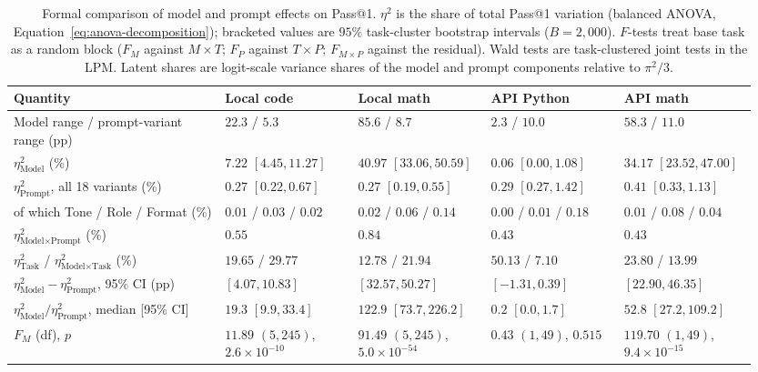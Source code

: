 \documentclass[a4paper,fleqn]{cas-sc}
\begin{document}
\begin{table}[htbp]
\centering
\caption{Formal comparison of model and prompt effects on Pass@1. $\eta^2$ is the share of total Pass@1 variation (balanced ANOVA, Equation~\ref{eq:anova-decomposition}); bracketed values are $95\%$ task-cluster bootstrap intervals ($B = 2{,}000$). $F$-tests treat base task as a random block ($F_M$ against $M \times T$; $F_P$ against $T \times P$; $F_{M \times P}$ against the residual). Wald tests are task-clustered joint tests in the LPM. Latent shares are logit-scale variance shares of the model and prompt components relative to $\pi^2/3$.}\label{tab:model-vs-prompt-decomposition}
\footnotesize
\setlength{\tabcolsep}{3pt}
\begin{tabular}{@{}p{0.27\linewidth}p{0.17\linewidth}p{0.17\linewidth}p{0.17\linewidth}p{0.17\linewidth}@{}}
\toprule
\textbf{Quantity} & \textbf{Local code} & \textbf{Local math} & \textbf{API Python} & \textbf{API math} \\
\midrule
Model range / prompt-variant range (pp) & $22.3$ / $5.3$ & $85.6$ / $8.7$ & $2.3$ / $10.0$ & $58.3$ / $11.0$ \\
\addlinespace[2pt]
$\eta^2_{\text{Model}}$ (\%) & $7.22$ $[4.45, 11.27]$ & $40.97$ $[33.06, 50.59]$ & $0.06$ $[0.00, 1.08]$ & $34.17$ $[23.52, 47.00]$ \\
$\eta^2_{\text{Prompt}}$, all 18 variants (\%) & $0.27$ $[0.22, 0.67]$ & $0.27$ $[0.19, 0.55]$ & $0.29$ $[0.27, 1.42]$ & $0.41$ $[0.33, 1.13]$ \\
\quad of which Tone / Role / Format (\%) & $0.01$ / $0.03$ / $0.02$ & $0.02$ / $0.06$ / $0.14$ & $0.00$ / $0.01$ / $0.18$ & $0.01$ / $0.08$ / $0.04$ \\
$\eta^2_{\text{Model} \times \text{Prompt}}$ (\%) & $0.55$ & $0.84$ & $0.43$ & $0.43$ \\
$\eta^2_{\text{Task}}$ / $\eta^2_{\text{Model} \times \text{Task}}$ (\%) & $19.65$ / $29.77$ & $12.78$ / $21.94$ & $50.13$ / $7.10$ & $23.80$ / $13.99$ \\
\addlinespace[2pt]
$\eta^2_{\text{Model}} - \eta^2_{\text{Prompt}}$, 95\% CI (pp) & $[4.07, 10.83]$ & $[32.57, 50.27]$ & $[-1.31, 0.39]$ & $[22.90, 46.35]$ \\
$\eta^2_{\text{Model}} / \eta^2_{\text{Prompt}}$, median [95\% CI] & $19.3$ $[9.9, 33.4]$ & $122.9$ $[73.7, 226.2]$ & $0.2$ $[0.0, 1.7]$ & $52.8$ $[27.2, 109.2]$ \\
\addlinespace[2pt]
$F_M$ (df), $p$ & $11.89$ $(5, 245)$, $2.6 \times 10^{-10}$ & $91.49$ $(5, 245)$, $5.0 \times 10^{-54}$ & $0.43$ $(1, 49)$, $0.515$ & $119.70$ $(1, 49)$, $9.4 \times 10^{-15}$ \\

\end{tabular}
\end{table}
\end{document}
